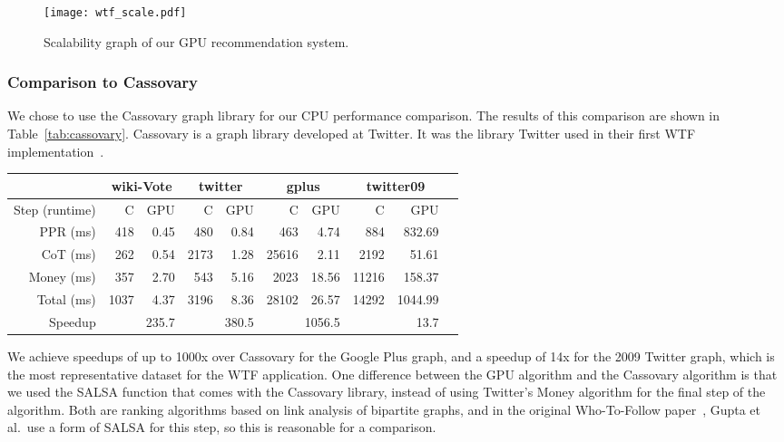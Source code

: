 \documentclass[format=acmsmall,review=false,screen=true]{acmart}
\begin{document}
\begin{figure}
  \centering
  \texttt{[image: wtf\_scale.pdf]}
  \caption{Scalability graph of our GPU recommendation system.\label{fig:runtime-vs-edge-count}}
\end{figure}

\subsubsection{Comparison to Cassovary}
We chose to use the Cassovary graph library for our CPU performance
comparison. The results of this comparison are shown in
Table~\ref{tab:cassovary}. Cassovary is a graph library developed at
Twitter. It was the library Twitter used in their first WTF
implementation~\cite{Gupta:2013:WTW}.

\begin{table*}
\centering
\caption{GPU WTF runtimes comparison to Cassovary (C).\label{tab:cassovary}}
\begin{tabular}{*{10}{r}}
\toprule & \multicolumn{2}{c}{wiki-Vote} & \multicolumn{2}{c}{twitter} & \multicolumn{2}{c}{gplus} & \multicolumn{2}{c}{twitter09} \\
\midrule Step (runtime) & C & GPU & C & GPU & C & GPU & C & GPU\\
\midrule PPR (ms) & 418 & 0.45 & 480 & 0.84 & 463 & 4.74 & 884 & 832.69\\
CoT (ms) & 262 & 0.54 & 2173 & 1.28 & 25616 & 2.11 & 2192 & 51.61\\
Money (ms) & 357 & 2.70 & 543 & 5.16 & 2023 & 18.56 & 11216 & 158.37\\
Total (ms) & 1037 & 4.37 & 3196 & 8.36 & 28102 & 26.57 & 14292 & 1044.99\\
Speedup & \multicolumn{2}{r}{235.7} & \multicolumn{2}{r}{380.5} & \multicolumn{2}{r}{1056.5} & \multicolumn{2}{r}{13.7}\\
\bottomrule
\end{tabular}
\end{table*}

We achieve speedups of up to 1000x over Cassovary for the Google Plus
graph, and a speedup of 14x for the 2009 Twitter graph, which is the
most representative dataset for the WTF application. One difference
between the GPU algorithm and the Cassovary algorithm is that we used
the SALSA function that comes with the Cassovary library, instead of
using Twitter's Money algorithm for the final step of the algorithm.
Both are ranking algorithms based on link analysis of bipartite
graphs, and in the original Who-To-Follow paper~\cite{Gupta:2013:WTW},
Gupta et al.\ use a form of SALSA for this step, so this is reasonable
for a comparison.
\end{document}
